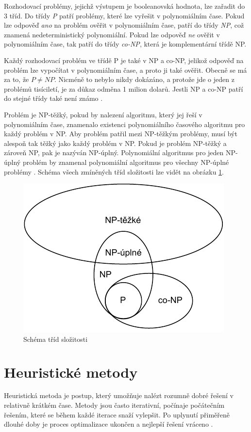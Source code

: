 Rozhodovací problémy, jejichž výstupem je booleanovská hodnota, lze zařadit do 3 tříd.
Do třídy \textit{P} patří problémy, které lze vyřešit v polynomiálním čase.
Pokud lze odpověď \textit{ano} na problém ověřit v polynomiálním čase, patří do třídy \textit{NP}, což znamená nedeterministický polynomiální.
Pokud lze odpověď \textit{ne} ověřit v polynomiálním čase, tak patří do třídy \textit{co-NP}, která je komplementární třídě NP.

Každý rozhodovací problém ve třídě P je také v NP a co-NP, jelikož odpověď na problém lze vypočítat v polynomiálním čase, a proto ji také ověřit.
Obecně se má za to, že $P\neq NP$.
Nicméně to nebylo nikdy dokázáno, a protože jde o jeden z problémů tisíciletí, je za důkaz odměna 1 milion dolarů.
Jestli NP a co-NP patří do stejné třídy také není známo \cite{erickson}.

Problém je NP-těžký, pokud by nalezení algoritmu, který jej řeší v polynomiálním čase, znamenalo existenci polynomiálního časového algoritmu pro každý problém v NP.
Aby problém patřil mezi NP-těžkým problémy, musí být alespoň tak těžký jako každý problém v NP.
Pokud je problém NP-těžký a zároveň NP, pak je nazýván NP-úplný.
Polynomiální algoritmus pro jeden NP-úplný problém by znamenal polynomiální algoritmus pro všechny NP-úplné problémy \cite{erickson}.
Schéma všech zmíněných tříd složitosti lze vidět na obrázku \ref{fig:complexity-classes}.

\begin{figure}[htbp]
\centerline{\includegraphics[scale=0.7]{img/complexity-classes.pdf}}
\caption{Schéma tříd složitosti}
\label{fig:complexity-classes}
\end{figure}

\section{Heuristické metody}
Heuristická metoda je postup, který umožňuje nalézt rozumně dobré řešení v relativně krátkém čase.
Metody jsou často iterativní, počínaje počátečním řešením, které se během každé iterace snaží vylepšit.
Po uplynutí přiměřeně dlouhé doby je proces optimalizace ukončen a nejlepší řešení vráceno \cite{kaveh}.

